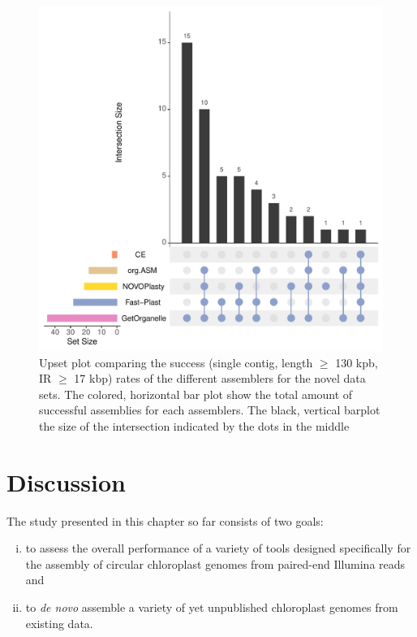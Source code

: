 \begin{figure}[H]
\centering
\includegraphics[height=.45\textheight, width=.95\textwidth]{Figures/upset_novel}
\decoRule
\caption[Upset plot comparing the success rates for novel data
sets]{Upset plot comparing the success (single contig, length $\geq$
  130 kpb, IR $\geq$ 17 kbp) rates of the different assemblers for the
  novel data sets. The colored, horizontal bar plot show the total
  amount of successful assemblies for each assemblers. The black,
  vertical barplot the size of the intersection indicated by the dots
  in the middle}
\label{fig:upset_novel}
\end{figure}

\section{Discussion} \label{dis_cp}

The study presented in this chapter so far consists of two goals:
\begin{enumerate}[(i)]
\item to assess the overall performance of a variety of tools designed specifically for
  the assembly of circular chloroplast genomes from paired-end Illumina reads and
\item to \textit{de novo} assemble a variety of yet unpublished chloroplast genomes from existing data.
\end{enumerate}


